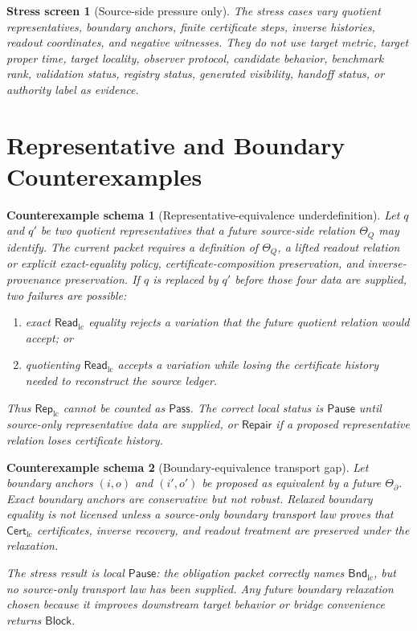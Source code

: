 \documentclass[11pt]{article}
\newcommand{\CertLC}{\mathsf{Cert}_{\mathrm{lc}}}
\newcommand{\ReadLC}{\mathsf{Read}_{\mathrm{lc}}}
\newcommand{\RepLC}{\mathsf{Rep}_{\mathrm{lc}}}
\newcommand{\BndLC}{\mathsf{Bnd}_{\mathrm{lc}}}
\newcommand{\Pass}{\mathsf{Pass}}
\newcommand{\Block}{\mathsf{Block}}
\newcommand{\Pause}{\mathsf{Pause}}
\newcommand{\Repair}{\mathsf{Repair}}
\newtheorem{stressscreen}{Stress screen}
\newtheorem{counterexample}{Counterexample schema}
\begin{document}
\begin{stressscreen}[Source-side pressure only]
The stress cases vary quotient representatives, boundary anchors,
finite certificate steps, inverse histories, readout coordinates, and
negative witnesses. They do not use target metric, target proper time,
target locality, observer protocol, candidate behavior, benchmark
rank, validation status, registry status, generated visibility,
handoff status, or authority label as evidence.
\end{stressscreen}

\section{Representative and Boundary Counterexamples}

\begin{counterexample}[Representative-equivalence underdefinition]
Let \(q\) and \(q'\) be two quotient representatives that a future
source-side relation \(\Theta_Q\) may identify. The current packet
requires a definition of \(\Theta_Q\), a lifted readout relation or
explicit exact-equality policy, certificate-composition preservation,
and inverse-provenance preservation. If \(q\) is replaced by \(q'\)
before those four data are supplied, two failures are possible:
\begin{enumerate}
    \item exact \(\ReadLC\) equality rejects a variation that the
    future quotient relation would accept; or
    \item quotienting \(\ReadLC\) accepts a variation while losing the
    certificate history needed to reconstruct the source ledger.
\end{enumerate}
Thus \(\RepLC\) cannot be counted as \(\Pass\). The correct local
status is \(\Pause\) until source-only representative data are
supplied, or \(\Repair\) if a proposed representative relation loses
certificate history.
\end{counterexample}

\begin{counterexample}[Boundary-equivalence transport gap]
Let boundary anchors \((i,o)\) and \((i',o')\) be proposed as
equivalent by a future \(\Theta_{\partial}\). Exact boundary anchors
are conservative but not robust. Relaxed boundary equality is not
licensed unless a source-only boundary transport law proves that
\(\CertLC\) certificates, inverse recovery, and readout treatment are
preserved under the relaxation.

The stress result is local \(\Pause\): the obligation packet correctly
names \(\BndLC\), but no source-only transport law has been supplied.
Any future boundary relaxation chosen because it improves downstream
target behavior or bridge convenience returns \(\Block\).
\end{counterexample}
\end{document}
